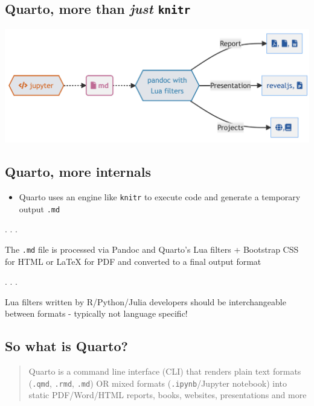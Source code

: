 \documentclass[
  letterpaper,
  DIV=11,
  numbers=noendperiod]{scrartcl}
\providecommand{\tightlist}{%
  \setlength{\itemsep}{0pt}\setlength{\parskip}{0pt}}\usepackage{longtable,booktabs,array}
\begin{document}
\hypertarget{quarto-more-than-just-knitr-2}{%
\subsection{\texorpdfstring{Quarto, more than \emph{just}
\texttt{knitr}}{Quarto, more than just knitr}}\label{quarto-more-than-just-knitr-2}}

\includegraphics{images/jupyter-alone.jpeg}

\hypertarget{quarto-more-internals}{%
\subsection{Quarto, more internals}\label{quarto-more-internals}}

\begin{itemize}
\tightlist
\item
  Quarto uses an engine like \texttt{knitr} to execute code and generate
  a temporary output \texttt{.md}
\end{itemize}

. . .

The \texttt{.md} file is processed via Pandoc and Quarto's Lua filters +
Bootstrap CSS for HTML or LaTeX for PDF and converted to a final output
format

. . .

Lua filters written by R/Python/Julia developers should be
interchangeable between formats - typically not language specific!

\hypertarget{so-what-is-quarto}{%
\subsection{So what is Quarto?}\label{so-what-is-quarto}}

\begin{quote}
Quarto is a command line interface (CLI) that renders plain text formats
(\texttt{.qmd}, \texttt{.rmd}, \texttt{.md}) OR mixed formats
(\texttt{.ipynb}/Jupyter notebook) into static PDF/Word/HTML reports,
books, websites, presentations and more
\end{quote}
\end{document}
